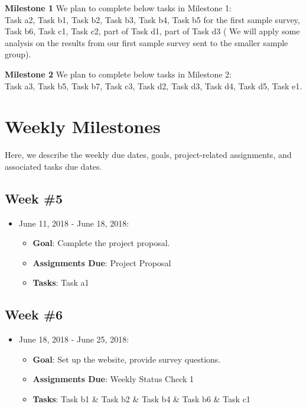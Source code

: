 \documentclass{sigchi}
\begin{document}
\textbf{Milestone 1}\newline
We plan to complete below tasks in Milestone 1:\\
Task a2, Task b1, Task b2, Task b3, Task b4, Task b5 for the first sample survey, Task b6, Task c1, Task c2, part of Task d1, part of Task d3 ( We will apply some analysis on the results from our first sample survey sent to the smaller sample group).

\textbf{Milestone 2}\newline
We plan to complete below tasks in Milestone 2:\\
Task a3, Task b5, Task b7, Task c3, Task d2, Task d3, Task d4, Task d5, Task e1.

\section{Weekly Milestones}
Here, we describe the weekly due dates, goals, project-related assignments, and associated tasks due dates.

\subsection{Week \#5}
\begin{itemize}
 	\item June 11, 2018 - June 18, 2018:
	\begin{itemize}
 		\item \textbf{Goal}: Complete the project proposal.
 		\item \textbf{Assignments Due}: Project Proposal
 		\item \textbf{Tasks}: Task a1
 	\end{itemize} 
 \end{itemize}


\subsection{Week \#6}
\begin{itemize}
 	\item June 18, 2018 - June 25, 2018:
	\begin{itemize}
 		\item \textbf{Goal}: Set up the website, provide survey questions.
 		\item \textbf{Assignments Due}: Weekly Status Check 1
 		\item \textbf{Tasks}: Task b1 \& Task b2 \& Task b4 \& Task b6 \& Task c1
	\end{itemize}
 \end{itemize} 
 
\end{document}
